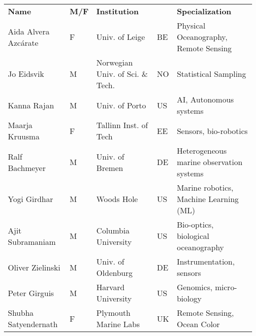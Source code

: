 \begin{table}[!t]
  \footnotesize{
\begin{tabular}{|p{3.5cm}|p{0.7cm}|p{4.0cm}|p{0.5cm}|p{6.0cm}|}
  \rowcolor{Gray}
  \bfseries Name& \bfseries M/F&\bfseries Institution & & \bfseries Specialization\\
  Aida Alvera Azc\'{a}rate    & F   & Univ. of Leige                        & BE       &Physical Oceanography, Remote Sensing\\
  \hline
  Jo Eidsvik               & M   & Norwegian Univ. of Sci. \& Tech.        & NO       & Statistical Sampling                            \\
  \hline
  Kanna Rajan              & M   & Univ. of Porto            & US       & AI, Autonomous systems           \\
  \hline
  Maarja Kruusma  & F   & Tallinn Inst. of Tech
                                                      & EE  & Sensors,
                                                              bio-robotics                                \\
  \hline
  Ralf Bachmeyer           & M   & Univ. of Bremen                       & DE       & Heterogeneous marine observation systems                        \\
  \hline
  Yogi Girdhar             & M   & Woods Hole
                                                      & US       &
                                                                   Marine
                                                                   robotics,
                                                                   Machine
                                                                   Learning
  (ML)\\
  \hline
  Ajit Subramaniam         & M   & Columbia University
                                                      & US       &
                                                                   Bio-optics, biological oceanography                        \\
  \hline
  Oliver Zielinski          & M   & Univ. of Oldenburg                   & DE       & Instrumentation, sensors                        \\
  \hline
  Peter Girguis            & M   & Harvard University                               & US       & Genomics, micro-biology                         \\
  \hline
  Shubha Satyendernath     & F   & Plymouth Marine Labs                  & UK       & Remote Sensing, Ocean Color                     \\

\end{tabular}}
\end{table}
